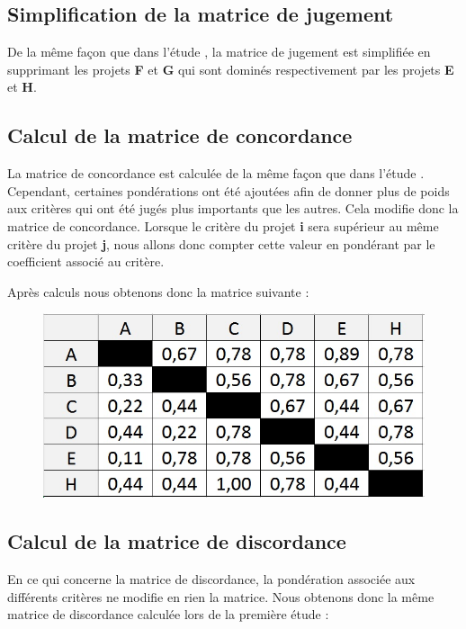 \documentclass[a4paper,10pt]{article}
\begin{document}
\subsection{Simplification de la matrice de jugement}

De la même façon que dans l'étude , la matrice de jugement est simplifiée en supprimant les projets \textbf{F} et \textbf{G} qui sont dominés respectivement par les projets \textbf{E} et \textbf{H}.

\subsection{Calcul de la matrice de concordance}

La matrice de concordance est calculée de la même façon que dans l'étude . Cependant, certaines pondérations ont été ajoutées afin de donner plus de poids aux critères qui ont été jugés plus importants que les autres. Cela modifie donc la matrice de concordance. Lorsque le critère du projet \textbf{i} sera supérieur au même critère du projet \textbf{j}, nous allons donc compter cette valeur en pondérant par le coefficient associé au critère. 

Après calculs nous obtenons donc la matrice suivante :


\begin{figure}[h]
\begin{center}
\includegraphics[scale=0.3]{img/AD_Concordance_ponderee.jpg}
\end{center}
\end{figure}

\subsection{Calcul de la matrice de discordance}

En ce qui concerne la matrice de discordance, la pondération associée aux différents critères ne modifie en rien la matrice. Nous obtenons donc la même matrice de discordance calculée lors de la première étude :
\end{document}
